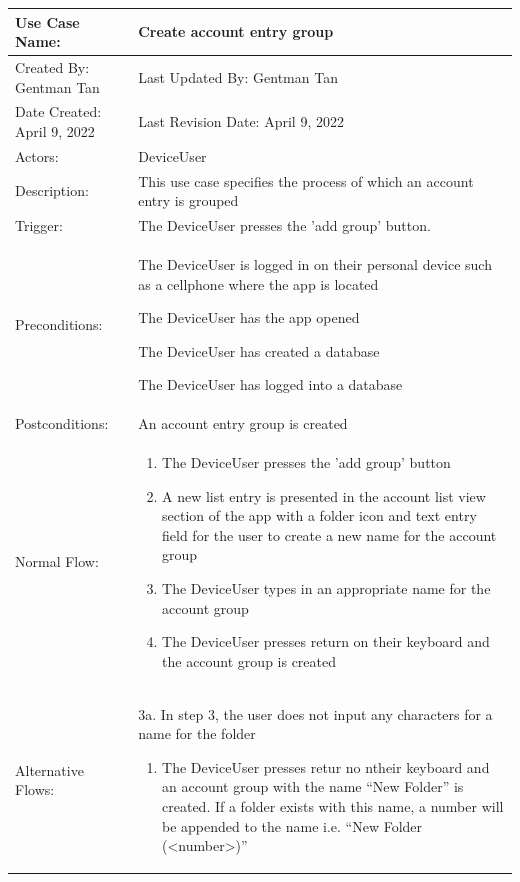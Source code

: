 \documentclass[stu]{apa7}
\newcommand{\nextitem}{\par\hspace*{\labelsep}\textbullet\hspace*{\labelsep}}
\newcommand{\nextitemblank}{\par\hspace*{\labelsep}\hspace*{\labelsep}}
\begin{document}
{{\begin{xltabular}{\textwidth}{|l|X|}
  Use Case Name: & Create account entry group \\ \hline

  Created By: Gentman Tan & Last Updated By: Gentman Tan\\ \hline

  Date Created: April 9, 2022 & Last Revision Date: April 9, 2022 \\ \hline

  Actors: & \nextitem DeviceUser \\ \hline

  Description: & This use case specifies the process of which an account entry is grouped \\ \hline

  Trigger: & The DeviceUser presses the 'add group' button. \\ \hline

  Preconditions: & \nextitem The DeviceUser is logged in on their personal device such as a cellphone where the app is located \nextitem The DeviceUser has the app opened \nextitem The DeviceUser has created a database \nextitem The DeviceUser has logged into a database \\ \hline

  Postconditions: & \nextitem An account entry group is created \\ \hline

  Normal Flow: &
    \begin{enumerate}
            \item The DeviceUser presses the 'add group' button
            \item A new list entry is presented in the account list view section of the app with a folder icon and text entry field for the user to create a new name for the account group
            \item The DeviceUser types in an appropriate name for the account group
            \item The DeviceUser presses return on their keyboard and the account group is created

    \end{enumerate} \\ \hline

  Alternative Flows: &
                       \nextitemblank 3a. In step 3, the user does not input any characters for a name for the folder
                       \begin{enumerate}
                               \item The DeviceUser presses retur no ntheir keyboard and an account group with the name ``New Folder'' is created. If a folder exists with this name, a number will be appended to the name i.e. ``New Folder (<number>)''
                       \end{enumerate}
              \\ \hline


\end{xltabular}}}
\end{document}
